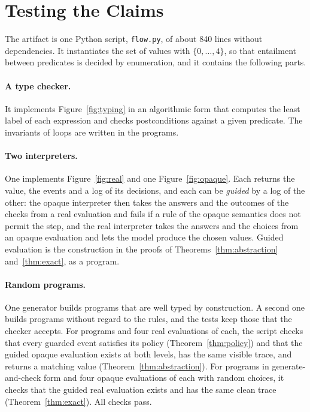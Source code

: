 \documentclass[acmsmall,nonacm,screen]{acmart}
\begin{document}
\section{Testing the Claims}
\label{sec:tests}

The artifact is one Python script, \texttt{flow.py}, of about 840 lines without
dependencies. It instantiates the set of values with $\{0, \ldots, 4\}$, so that entailment
between predicates is decided by enumeration, and it contains the following parts.

\paragraph{A type checker.} It implements Figure~\ref{fig:typing} in an algorithmic form
that computes the least label of each expression and checks postconditions against a given
predicate. The invariants of loops are written in the programs.

\paragraph{Two interpreters.} One implements Figure~\ref{fig:real} and one
Figure~\ref{fig:opaque}. Each returns the value, the events and a log of its decisions, and
each can be \emph{guided} by a log of the other: the opaque interpreter then takes the
answers and the outcomes of the checks from a real evaluation and fails if a rule of the
opaque semantics does not permit the step, and the real interpreter takes the answers and
the choices from an opaque evaluation and lets the model produce the chosen values. Guided
evaluation is the construction in the proofs of Theorems~\ref{thm:abstraction}
and~\ref{thm:exact}, as a program.

\paragraph{Random programs.} One generator builds programs that are well typed by
construction. A second one builds programs without regard to the rules, and the tests keep
those that the checker accepts. For \exPrograms{} programs and four real evaluations of
each, the script checks that every guarded event satisfies its policy
(Theorem~\ref{thm:policy}) and that the guided opaque evaluation exists at both levels, has
the same visible trace, and returns a matching value (Theorem~\ref{thm:abstraction}). For
\exPaired{} programs in generate-and-check form and four opaque evaluations of each with
random choices, it checks that the guided real evaluation exists and has the same clean
trace (Theorem~\ref{thm:exact}). All checks pass.
\end{document}

